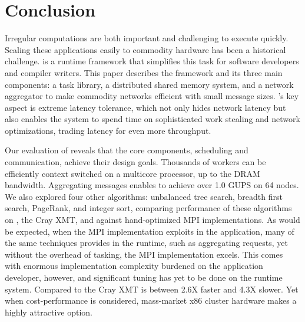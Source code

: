 \section{Conclusion}

Irregular computations are both important and challenging to execute quickly.
Scaling these applications easily to commodity hardware has been a historical
challenge. \Grappa is a runtime framework that simplifies this task for
software developers and compiler writers. This paper describes the \Grappa
framework and its three main components: a task library, a distributed shared
memory system, and a network aggregator to make commodity networks efficient
with small message sizes. \Grappa's key aspect is extreme latency tolerance,
which not only hides network latency but also enables the system to spend time
on sophisticated work stealing and network optimizations, trading latency for
even more throughput.

Our evaluation of \Grappa reveals that the core components, scheduling and communication, achieve their design goals.  Thousands of workers can be efficiently context switched on a multicore processor, up to the DRAM bandwidth.  Aggregating messages enables \Grappa to achieve over 1.0 GUPS on 64 nodes.  We also explored four other algorithms: unbalanced tree search, breadth first search, PageRank, and integer sort, comparing performance of these algorithms on \Grappa, the Cray XMT, and against hand-optimized MPI implementations.  As would be expected, when the MPI implementation exploits in the application, many of the same techniques \Grappa provides in the runtime, such as aggregating requests, yet without the overhead of tasking, the MPI implementation excels.  This comes with enormous implementation complexity burdened on the application developer, however, and significant tuning has yet to be done on the \Grappa runtime system.  Compared to the Cray XMT \Grappa is between 2.6X faster and 4.3X slower.  Yet when cost-performance is considered, mass-market x86 cluster hardware makes \Grappa a highly attractive option.
